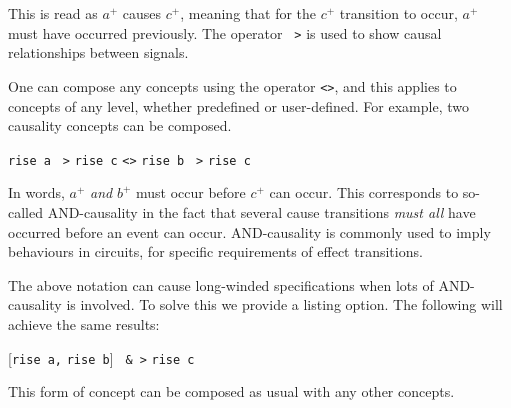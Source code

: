 \documentclass[british,conference,compsoc]{IEEEtran}
\begin{document}
\vspace{-1mm}

This is read as $a^{+}$ causes $c^{+}$, meaning that for the $c^{+}$ transition 
to occur, $a^{+}$ must have occurred previously. The operator
\texttt{~>}
is used to show causal relationships between signals.
 

One can compose any concepts using the
operator \texttt{<>}, and this applies
to concepts of any level, whether predefined or user-defined. For example, 
two causality concepts can be composed.

\vspace{-1.5mm}

\begin{center}
\texttt{rise a} \texttt{~>} \texttt{rise c} \texttt{<>} \texttt{rise b} \texttt{~>} \texttt{rise c}
\end{center}

\vspace{-1mm}

In words, $a^{+}$ \emph{and} $b^{+}$ must occur before $c^{+}$ can occur. 
This corresponds to so-called AND-causality in the fact that several cause 
transitions \emph{must all} have occurred before an event can occur. 
AND-causality is commonly used to imply behaviours in circuits, for specific 
requirements of effect transitions.  

The above notation can cause long-winded specifications when lots of 
AND-causality is involved. To solve this we provide a listing option. The 
following will achieve the same results:

\vspace{-3mm}

\begin{center}
      [\texttt{rise a,} \texttt{rise b}] \texttt{~&~>} \texttt{rise c}
\end{center}

\vspace{-1mm}

This form of concept can be composed as usual with any other concepts.
\end{document}
